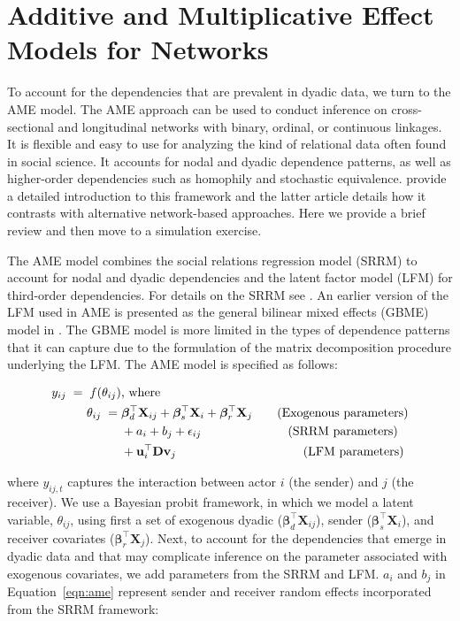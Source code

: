 \section{\textbf{Additive and Multiplicative Effect Models for Networks}}

To account for the dependencies that are prevalent in dyadic data, we turn to the AME model. The AME approach can be used to conduct inference on cross-sectional and longitudinal networks with binary, ordinal, or continuous linkages. It is flexible and easy to use for analyzing the kind of relational data often found in social science. It accounts for nodal and dyadic dependence patterns, as well as higher-order dependencies such as homophily and stochastic equivalence. \citet{hoff:2015:arxiv,minhas:etal:2016:arxiv} provide a detailed introduction to this framework and the latter article details how it contrasts with alternative network-based approaches. Here we provide a brief review and then move to a simulation exercise.

The AME model combines the social relations regression model (SRRM) to account for nodal and dyadic dependencies and the latent factor model (LFM) for third-order dependencies.  For details on the SRRM see \citet{li:loken:2002,dorff:minhas:2017}. An earlier version of the LFM  used in AME is presented as the general bilinear mixed effects (GBME) model in \citet{hoff:ward:2004}. The GBME model is more limited in the types of dependence patterns that it can capture due to the formulation of the matrix decomposition procedure underlying the LFM. The AME model is specified as follows:

\begin{align}
	\begin{aligned}
		y_{ij} \;=\; f(\theta_{ij}) &\text{, where } \\
		\theta_{ij} \;=\;& \bm\beta_{d}^{\top} \mathbf{X}_{ij} + \bm\beta_{s}^{\top} \mathbf{X}_{i} + \bm\beta_{r}^{\top} \mathbf{X}_{j} \text{\qquad(Exogenous parameters)} \\
		& + a_{i} + b_{j} + \epsilon_{ij} \text{\qquad\qquad\qquad\quad(SRRM parameters)} \\
		& + \mathbf{u}_{i}^{\top} \mathbf{D} \mathbf{v}_{j}  \text{\qquad\qquad\qquad\qquad\qquad\;(LFM parameters)} \\ 
	\label{eqn:ame}
	\end{aligned}
\end{align}

where $y_{ij,t}$ captures the interaction between actor $i$ (the sender) and $j$ (the receiver). We use a Bayesian probit framework, in which we model a latent variable, $\theta_{ij}$, using first a set of exogenous dyadic ($\bm\beta_{d}^{\top} \mathbf{X}_{ij}$), sender ($\bm\beta_{s}^{\top} \mathbf{X}_{i}$), and receiver covariates ($\bm\beta_{r}^{\top} \mathbf{X}_{j}$). Next, to account for the dependencies that emerge in dyadic data and that may complicate inference on the parameter associated with exogenous covariates, we add parameters from the SRRM and LFM. $a_{i}$ and $b_{j}$ in Equation~\ref{eqn:ame} represent sender and receiver random effects incorporated from the SRRM framework:

